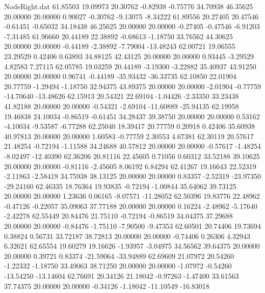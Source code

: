\begin{filecontents}{NodeRight.dat}
  61.85503   19.09973   20.30762    -0.82938   -0.75776   34.70938   46.35625   20.00000   20.00000    0.90027   -0.30762   -9.13075   -8.34222
  61.89556   20.27405   20.47546    -0.61451   -0.65032   34.18438   46.25625   20.00000   20.00000   -0.27405   -0.47546   -6.91203   -7.31485
  61.96660   20.44189   22.38892    -0.68613   -1.18750   33.76562   44.30625   20.00000   20.00000   -0.44189   -2.38892   -7.79004  -13.48243
  62.00721   19.06555   23.29529     0.42406    0.63893   34.88125   42.43125   20.00000   20.00000    0.93445   -3.29529    4.82583    7.27115
  62.05785   19.03259   20.44189    -3.19300   -3.22882   35.40937   43.91250   20.00000   20.00000    0.96741   -0.44189  -35.93432  -36.33735
  62.10850   22.01904   20.77759    -1.29494   -1.18750   32.94375   43.89375   20.00000   20.00000   -2.01904   -0.77759  -14.70640  -13.48626
  62.15913   20.54321   22.69104    -1.04426   -2.33350   33.23438   41.82188   20.00000   20.00000   -0.54321   -2.69104  -11.60889  -25.94135
  62.19958   19.46838   24.10034    -0.86519   -0.61451   34.28437   39.38750   20.00000   20.00000    0.53162   -4.10034   -9.53587   -6.77288
  62.25040   18.39417   20.77759     0.20918    0.42406   35.60938   40.97813   20.00000   20.00000    1.60583   -0.77759    2.30553    4.67381
  62.30119   20.57617   21.48254    -0.72194   -1.11588   34.24688   40.57812   20.00000   20.00000   -0.57617   -1.48254   -8.02497  -12.40390
  62.36206   20.81116   22.45605     0.71056    0.60312   33.52188   39.10625   20.00000   20.00000   -0.81116   -2.45605    8.06192    6.84294
  62.41267   19.16643   22.52319    -2.11863   -2.58419   34.75938   38.13125   20.00000   20.00000    0.83357   -2.52319  -23.97350  -29.24160
  62.46335   18.76364   19.93835    -0.72194   -1.00844   35.64062   39.73125   20.00000   20.00000    1.23636    0.06165   -8.07571  -11.28052
  62.50396   19.83776   22.48962    -0.47126   -0.22057   35.09063   37.77188   20.00000   20.00000    0.16224   -2.48962   -5.17640   -2.42278
  62.55449   20.84476   21.75110    -0.72194   -0.86519   34.04375   37.29688   20.00000   20.00000   -0.84476   -1.75110   -7.90500   -9.47353
  62.60501   20.74406   19.73694     0.38824    0.56731   33.72187   38.72813   20.00000   20.00000   -0.74406    0.26306    4.32943    6.32621
  62.65554   19.60279   19.16626    -1.93957   -3.04975   34.56562   39.64375   20.00000   20.00000    0.39721    0.83374  -21.59064  -33.94889
  62.69609   21.07972   20.54260    -1.22332   -1.18750   33.49063   38.71250   20.00000   20.00000   -1.07972   -0.54260  -13.54250  -13.14604
  62.76691   20.34126   21.18042    -0.97263   -1.47400   33.61563   37.74375   20.00000   20.00000   -0.34126   -1.18042  -11.10549  -16.83018

\end{filecontents}
